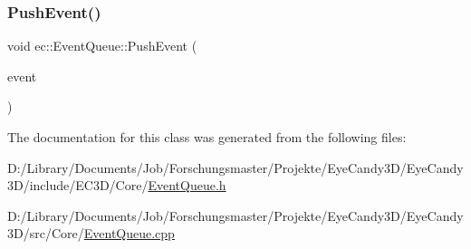 \subsubsection{\texorpdfstring{Push\+Event()}{PushEvent()}}
{\footnotesize\ttfamily void ec\+::\+Event\+Queue\+::\+Push\+Event (\begin{DoxyParamCaption}\item[{const \mbox{\hyperlink{structec_1_1_input_event}{Input\+Event}} \&}]{event }\end{DoxyParamCaption})}



The documentation for this class was generated from the following files\+:\begin{DoxyCompactItemize}
\item 
D\+:/\+Library/\+Documents/\+Job/\+Forschungsmaster/\+Projekte/\+Eye\+Candy3\+D/\+Eye\+Candy3\+D/include/\+E\+C3\+D/\+Core/\mbox{\hyperlink{_event_queue_8h}{Event\+Queue.\+h}}\item 
D\+:/\+Library/\+Documents/\+Job/\+Forschungsmaster/\+Projekte/\+Eye\+Candy3\+D/\+Eye\+Candy3\+D/src/\+Core/\mbox{\hyperlink{_event_queue_8cpp}{Event\+Queue.\+cpp}}\end{DoxyCompactItemize}
